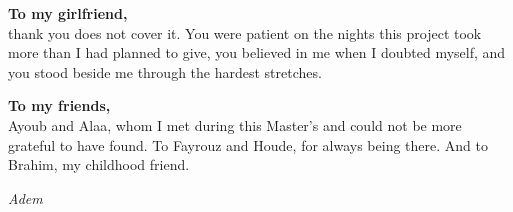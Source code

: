 \documentclass[12pt,a4paper,oneside]{report}
\newcommand{\blankpage}{%
  \newpage
  \thispagestyle{empty}
  \mbox{}
  \newpage
}
\begin{document}
\vspace{0.5cm}

\noindent\textbf{To my girlfriend,}\\
thank you does not cover it. You were patient on the nights this project took
more than I had planned to give, you believed in me when I doubted myself, and
you stood beside me through the hardest stretches.

\vspace{0.5cm}

\noindent\textbf{To my friends,}\\
Ayoub and Alaa, whom I met during this Master's and could not be more grateful
to have found. To Fayrouz and Houde, for always being there. And to Brahim,
my childhood friend.


\vspace{1.5cm}
\begin{flushright}
\textit{Adem}
\end{flushright}

\blankpage












\end{document}
